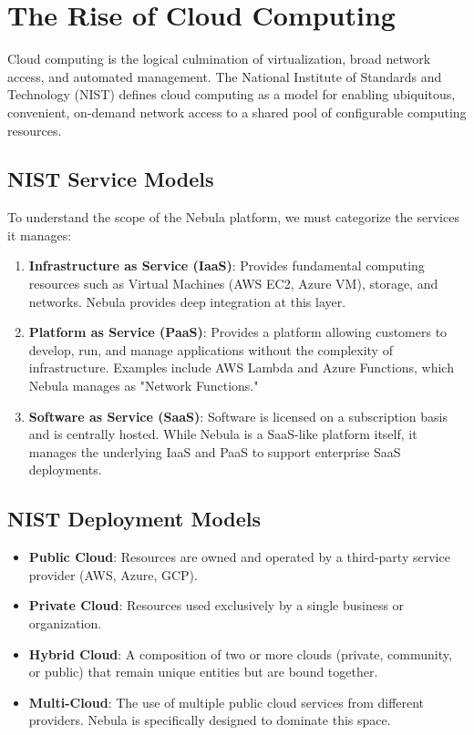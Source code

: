 \section{The Rise of Cloud Computing}
Cloud computing is the logical culmination of virtualization, broad network access, and automated management. The National Institute of Standards and Technology (NIST) defines cloud computing as a model for enabling ubiquitous, convenient, on-demand network access to a shared pool of configurable computing resources.

\subsection{NIST Service Models}
To understand the scope of the Nebula platform, we must categorize the services it manages:
\begin{enumerate}
    \item \textbf{Infrastructure as Service (IaaS)}: Provides fundamental computing resources such as Virtual Machines (AWS EC2, Azure VM), storage, and networks. Nebula provides deep integration at this layer.
    \item \textbf{Platform as Service (PaaS)}: Provides a platform allowing customers to develop, run, and manage applications without the complexity of infrastructure. Examples include AWS Lambda and Azure Functions, which Nebula manages as "Network Functions."
    \item \textbf{Software as Service (SaaS)}: Software is licensed on a subscription basis and is centrally hosted. While Nebula is a SaaS-like platform itself, it manages the underlying IaaS and PaaS to support enterprise SaaS deployments.
\end{enumerate}

\subsection{NIST Deployment Models}
\begin{itemize}
    \item \textbf{Public Cloud}: Resources are owned and operated by a third-party service provider (AWS, Azure, GCP).
    \item \textbf{Private Cloud}: Resources used exclusively by a single business or organization.
    \item \textbf{Hybrid Cloud}: A composition of two or more clouds (private, community, or public) that remain unique entities but are bound together.
    \item \textbf{Multi-Cloud}: The use of multiple public cloud services from different providers. Nebula is specifically designed to dominate this space.
\end{itemize}

